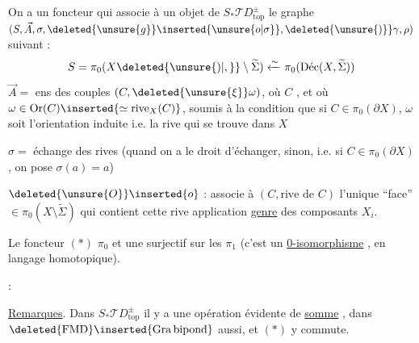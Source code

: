 
On a un foncteur
qui associe à un objet  de
$S_*\mathcal TD^\pm_{\mathrm{top}}$ le graphe 
$(S,\vec A,\sigma,\deleted{\unsure{g}}\inserted{\unsure{o|\sigma}},\deleted{\unsure{)}}\gamma,\rho)$ suivant :
\[
S=\pi_0(X\deleted{\unsure{)|,}}\setminus\widetilde\Sigma)\xleftarrow{\sim}\pi_0(\text{Déc}(X,\widetilde\Sigma))
\]
$\vec A=$ ens des couples $(C,\deleted{\unsure{\xi}}\omega)$, où
$C$ , et où
$\omega\in\mathrm{Or}(C)\inserted{\simeq\mathrm{rive}_X(C)}$,
soumis à la condition que si $C\in\pi_0(\partial X)$,  $\omega$
soit l'orientation induite i.e. la rive qui se trouve dans $X$

$\sigma=$ échange des rives (quand on a le droit d'échanger,
sinon, i.e. si $C\in\pi_0(\partial X)$, on pose $\sigma(a)=a$)

$\deleted{\unsure{O}}\inserted{o}$ : associe à $(C,\text{rive de }C)$
l'unique ``face'' $\in\pi_0(X\setminus\widetilde\Sigma)$ qui
 contient cette rive
application \uline{genre} des composants $X_i$.

Le foncteur $(*)$ 
 $\pi_0$ et une surjectif
sur les $\pi_1$ (c'est un \uline{0-isomorphisme} ,
en langage homotopique).

 :

\uline{Remarques}. Dans $S_*\mathcal TD^\pm_{\mathrm{top}}$ il y a une
opération évidente de \uline{somme} ,
dans $\deleted{\mathrm{FMD}}\inserted{\mathrm{Gra\,bipond}}$ aussi,
et $(*)$ y commute.

